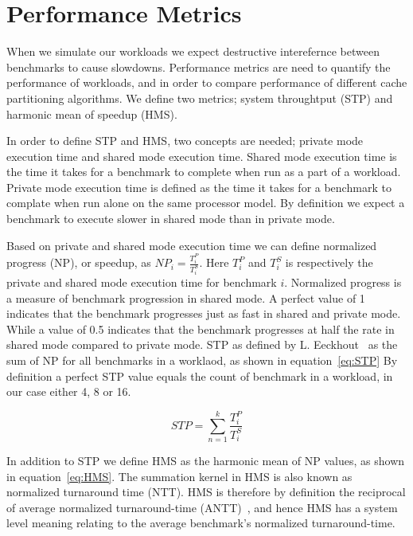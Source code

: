 \section{Performance Metrics}
\label{sec:methodology:metrics}

When we simulate our workloads we expect destructive interefernce between benchmarks to cause slowdowns.
Performance metrics are need to quantify the performance of workloads, and in order to compare performance of different cache partitioning algorithms.
We define two metrics; system throughtput (STP) and harmonic mean of speedup (HMS).

In order to define STP and HMS, two concepts are needed; private mode execution time and shared mode execution time.
Shared mode execution time is the time it takes for a benchmark to complete when run as a part of a workload.
Private mode execution time is defined as the time it takes for a benchmark to complate when run alone on the same processor model.
By definition we expect a benchmark to execute slower in shared mode than in private mode.

Based on private and shared mode execution time we can define normalized progress (NP), or speedup, as $NP_i = \frac{T^{P}_i}{T^{S}_i}$.
Here $T^{P}_i$ and $T^{S}_i$ is respectively the private and shared mode execution time for benchmark $i$.
Normalized progress is a measure of benchmark progression in shared mode.
A perfect value of 1 indicates that the benchmark progresses just as fast in shared and private mode.
While a value of 0.5 indicates that the benchmark progresses at half the rate in shared mode compared to private mode.
STP as defined by L. Eeckhout~\cite{Eeckhout2010} as the sum of NP for all benchmarks in a worklaod, as shown in equation~\ref{eq:STP}
By definition a perfect STP value equals the count of benchmark in a workload, in our case either 4, 8 or 16.

\begin{equation} \label{eq:STP} 
 STP = {\sum\limits_{n=1}^{k}}\frac{T^{P}_i}{T^{S}_i}
\end{equation}

In addition to STP we define HMS as the harmonic mean of NP values, as shown in equation~\ref{eq:HMS}.
The summation kernel in HMS is also known as normalized turnaround time (NTT).
HMS is therefore by definition the reciprocal of average normalized turnaround-time (ANTT)~\cite{Eeckhout2010}, and hence HMS has a system level meaning relating to the average benchmark's normalized turnaround-time.

